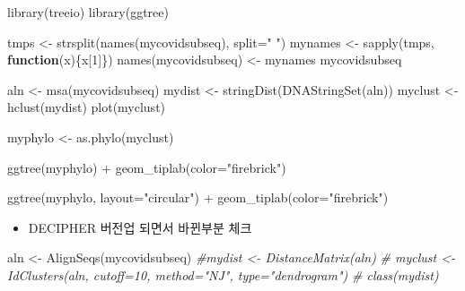 \documentclass[
]{book}
\newenvironment{Shaded}{\begin{snugshade}}{\end{snugshade}}
\newcommand{\AttributeTok}[1]{\textcolor[rgb]{0.77,0.63,0.00}{#1}}
\newcommand{\CommentTok}[1]{\textcolor[rgb]{0.56,0.35,0.01}{\textit{#1}}}
\newcommand{\ControlFlowTok}[1]{\textcolor[rgb]{0.13,0.29,0.53}{\textbf{#1}}}
\newcommand{\DecValTok}[1]{\textcolor[rgb]{0.00,0.00,0.81}{#1}}
\newcommand{\FunctionTok}[1]{\textcolor[rgb]{0.00,0.00,0.00}{#1}}
\newcommand{\NormalTok}[1]{#1}
\newcommand{\OtherTok}[1]{\textcolor[rgb]{0.56,0.35,0.01}{#1}}
\newcommand{\SpecialCharTok}[1]{\textcolor[rgb]{0.00,0.00,0.00}{#1}}
\newcommand{\StringTok}[1]{\textcolor[rgb]{0.31,0.60,0.02}{#1}}
\providecommand{\tightlist}{%
  \setlength{\itemsep}{0pt}\setlength{\parskip}{0pt}}
\begin{document}
\begin{Shaded}
\begin{Highlighting}[]
\FunctionTok{library}\NormalTok{(treeio)}
\FunctionTok{library}\NormalTok{(ggtree)}


\NormalTok{tmps }\OtherTok{\textless{}{-}} \FunctionTok{strsplit}\NormalTok{(}\FunctionTok{names}\NormalTok{(mycovidsubseq), }\AttributeTok{split=}\StringTok{" "}\NormalTok{)}
\NormalTok{mynames }\OtherTok{\textless{}{-}} \FunctionTok{sapply}\NormalTok{(tmps, }\ControlFlowTok{function}\NormalTok{(x)\{x[}\DecValTok{1}\NormalTok{]\})}
\FunctionTok{names}\NormalTok{(mycovidsubseq) }\OtherTok{\textless{}{-}}\NormalTok{ mynames}
\NormalTok{mycovidsubseq}

\NormalTok{aln }\OtherTok{\textless{}{-}} \FunctionTok{msa}\NormalTok{(mycovidsubseq)}
\NormalTok{mydist }\OtherTok{\textless{}{-}} \FunctionTok{stringDist}\NormalTok{(}\FunctionTok{DNAStringSet}\NormalTok{(aln))}
\NormalTok{myclust }\OtherTok{\textless{}{-}} \FunctionTok{hclust}\NormalTok{(mydist)}
\FunctionTok{plot}\NormalTok{(myclust)}

\NormalTok{myphylo }\OtherTok{\textless{}{-}} \FunctionTok{as.phylo}\NormalTok{(myclust)}

\FunctionTok{ggtree}\NormalTok{(myphylo)  }\SpecialCharTok{+}
  \FunctionTok{geom\_tiplab}\NormalTok{(}\AttributeTok{color=}\StringTok{"firebrick"}\NormalTok{)}

\FunctionTok{ggtree}\NormalTok{(myphylo, }\AttributeTok{layout=}\StringTok{"circular"}\NormalTok{)  }\SpecialCharTok{+}
  \FunctionTok{geom\_tiplab}\NormalTok{(}\AttributeTok{color=}\StringTok{"firebrick"}\NormalTok{)}
\end{Highlighting}
\end{Shaded}

\begin{itemize}
\tightlist
\item
  DECIPHER 버전업 되면서 바뀐부분 체크
\end{itemize}

\begin{Shaded}
\begin{Highlighting}[]
\NormalTok{aln }\OtherTok{\textless{}{-}} \FunctionTok{AlignSeqs}\NormalTok{(mycovidsubseq)}
\CommentTok{\#mydist \textless{}{-} DistanceMatrix(aln)}
\CommentTok{\# myclust \textless{}{-} IdClusters(aln, cutoff=10, method="NJ", type="dendrogram")}
\CommentTok{\# class(mydist)}
\end{Highlighting}
\end{Shaded}
\end{document}
